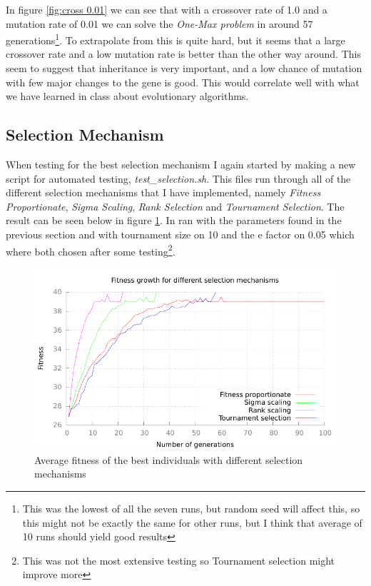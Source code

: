 In figure \ref{fig:cross 0.01} we can see that with a crossover rate of 1.0 and
a mutation rate of 0.01 we can solve the \textit{One-Max problem} in around 57
generations\footnote{This was the lowest of all the seven runs, but random seed
	will affect this, so this might not be exactly the same for other
runs, but I think that average of 10 runs should yield good results}. To
extrapolate from this is quite hard, but it seems that a large crossover rate
and a low mutation rate is better than the other way around. This seem to
suggest that inheritance is very important, and a low chance of mutation with
few major changes to the gene is good. This would correlate well with what we
have learned in class about evolutionary algorithms.

\subsection{Selection Mechanism}\label{sec:selection mechanism}
When testing for the best selection mechanism I again started by making a new
script for automated testing, \textit{test\_selection.sh}. This files run
through all of the different selection mechanisms that I have implemented,
namely \textit{Fitness Proportionate}, \textit{Sigma Scaling}, \textit{Rank
Selection} and \textit{Tournament Selection}. The result can be seen below in
figure \ref{fig:selection}. In ran with the parameters found in the previous
section and with tournament size on 10 and the e factor on 0.05 which where both
chosen after some testing\footnote{This was not the most extensive testing so
Tournament selection might improve more}.

\begin{figure}[h!]
	\includegraphics{../graphs/fitness_selection_average.pdf}
	\caption{Average fitness of the best individuals with different
	selection mechanisms}
	\label{fig:selection}
\end{figure}

